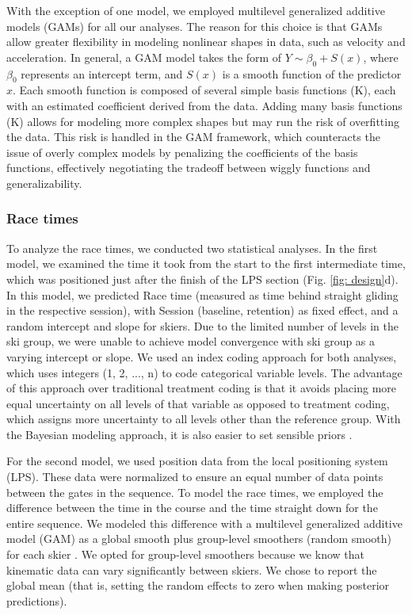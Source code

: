 \documentclass{article}
\begin{document}
 With the exception of one model, we employed multilevel generalized additive models (GAMs) \cite{pedersen_hierarchical_2019} for all our analyses. The reason for this choice is that GAMs allow greater flexibility in modeling nonlinear shapes in data, such as velocity and acceleration. In general, a GAM model takes the form of $Y \sim \beta_0 + S(x)$, where $\beta_0$ represents an intercept term, and $S(x)$ is a smooth function of the predictor $x$. Each smooth function is composed of several simple basis functions (K), each with an estimated coefficient derived from the data. Adding many basis functions (K) allows for modeling more complex shapes but may run the risk of overfitting the data. This risk is handled in the GAM framework, which counteracts the issue of overly complex models by penalizing the coefficients of the basis functions, effectively negotiating the tradeoff between wiggly functions and generalizability.

\subsubsection{Race times}
To analyze the race times, we conducted two statistical analyses. In the first model, we examined the time it took from the start to the first intermediate time, which was positioned just after the finish of the LPS section (Fig. \ref{fig: design}d). In this model, we predicted Race time (measured as time behind straight gliding in the respective session), with Session (baseline, retention) as fixed effect, and a random intercept and slope for skiers. Due to the limited number of levels in the ski group, we were unable to achieve model convergence with ski group as a varying intercept or slope. We used an index coding approach for both analyses, which uses integers (1, 2, ..., n) to code categorical variable levels. The advantage of this approach over traditional treatment coding is that it avoids placing more equal uncertainty on all levels of that variable as opposed to treatment coding, which assigns more uncertainty to all levels other than the reference group. With the Bayesian modeling approach, it is also easier to set sensible priors \cite{mcelreath_statistical_2018}. 

For the second model, we used position data from the local positioning system (LPS). These data were normalized to ensure an equal number of data points between the gates in the sequence. To model the race times, we employed the difference between the time in the course and the time straight down for the entire sequence. We modeled this difference with a multilevel generalized additive model (GAM) as a global smooth plus group-level smoothers (random smooth) for each skier \cite{pedersen_hierarchical_2019}. We opted for group-level smoothers because we know that kinematic data can vary significantly between skiers. We chose to report the global mean (that is, setting the random effects to zero when making posterior predictions). 
\end{document}
